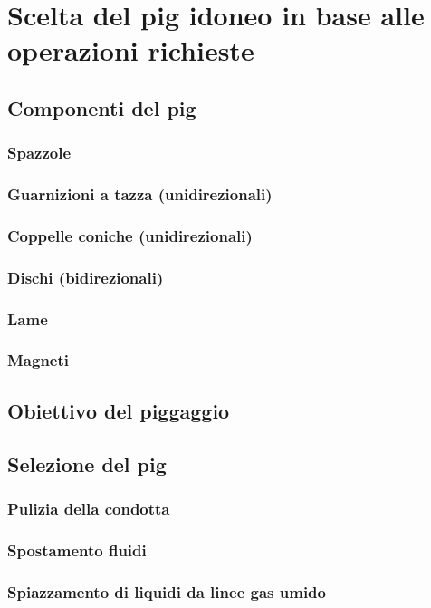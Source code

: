 \section{Scelta del pig idoneo in base alle operazioni richieste}

\subsection{Componenti del pig}
\subsubsection{Spazzole}
\subsubsection{Guarnizioni a tazza (unidirezionali)}
\subsubsection{Coppelle coniche (unidirezionali)}
\subsubsection{Dischi (bidirezionali)}
\subsubsection{Lame}
\subsubsection{Magneti}

\subsection{Obiettivo del piggaggio}

\subsection{Selezione del pig}
\subsubsection{Pulizia della condotta}
\subsubsection{Spostamento fluidi}
\subsubsection{Spiazzamento di liquidi da linee gas umido}

